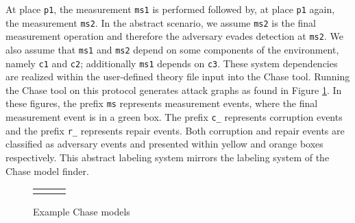 \documentclass[runningheads]{llncs}
\theoremstyle{definition}
\begin{document}
\noindent At place \texttt{p1}, the measurement \texttt{ms1} is performed followed by, at place \texttt{p1} again, the measurement \texttt{ms2}. In the abstract scenario, we assume \texttt{ms2} is the final measurement operation and therefore the adversary evades detection at \texttt{ms2}. We also assume that \texttt{ms1} and \texttt{ms2} depend on some components of the environment, namely \texttt{c1} and \texttt{c2}; additionally \texttt{ms1} depends on \texttt{c3}. These system dependencies are realized within the user-defined theory file input into the Chase tool. Running the Chase tool on this protocol generates attack graphs as found in Figure \ref{fig:chase-ex}. In these figures, the prefix \texttt{ms} represents measurement events, where the final measurement event is in a green box. The prefix \texttt{c\_} represents corruption events and the prefix \texttt{r\_} represents repair events. Both corruption and repair events are classified as adversary events and presented within yellow and orange boxes respectively. This abstract labeling system mirrors the labeling system of the Chase model finder. 


\begin{figure}[hbtp]
    \centering 
    \begin{tabular}{c c c}
         &  &  
    \end{tabular}
    \caption[Example Chase Models]{Example Chase models}
    \label{fig:chase-ex}
\end{figure}
\end{document}
